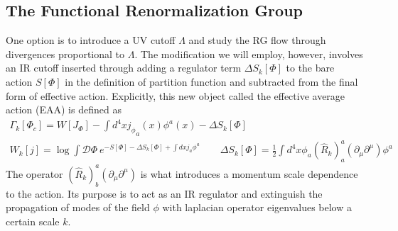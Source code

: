 \documentclass[11pt, a4paper]{article}
\begin{document}
\subsection{The Functional Renormalization Group}
 One option is to introduce a UV cutoff $\Lambda$
and study the RG flow through divergences proportional to $\Lambda$. The modification we will employ, however, involves
an IR cutoff inserted through adding a regulator term $\Delta S_k[\Phi]$ to the bare action $S[\Phi]$ in the definition of partition function
and subtracted from the final form of effective action. Explicitly, this new object called the effective average action (EAA) is defined as
\begin{gather}
    \Gamma_k[\Phi_c] = W[J_\Phi] - \int d^4 x {j_\phi}_a(x) \phi^a(x) - \Delta S_k[\Phi]\\
    W_k[j] = \log{\int \mathcal{D}\Phi \ e^{-S[\Phi] - \Delta S_k[\Phi] + \int dx j_a \phi^a}} \qquad \Delta S_k[\Phi] = \frac{1}{2}\int d^4 x \phi_a (\hat{R}_k)^a_a (\partial_{\mu}\partial^{\mu}) \phi^a
\end{gather}
The operator $(\hat{R}_k)^a_b (\partial_{\mu}\partial^{\mu})$ is what introduces a momentum scale dependence to the action.
Its purpose is to act as an IR regulator and extinguish the propagation of modes of the field $\phi$ with laplacian operator eigenvalues below a certain scale $k$.

\end{document}
